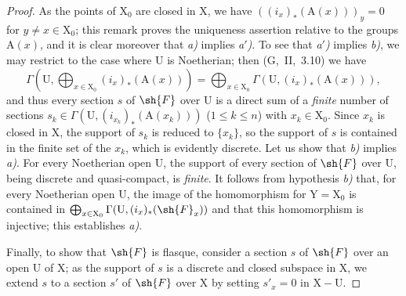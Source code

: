 \begin{proof}
As the points of $\mathrm{X}_0$ are closed in $\mathrm{X}$, we have $((i_x)_*(\mathrm{A}(x)))_y=0$ for $y\neq x\in\mathrm{X}_0$;
this remark proves the uniqueness assertion relative to the groups $\mathrm{A}(x)$, and it is clear moreover that \emph{a)} implies \emph{a$'$)}.
To see that \emph{a$'$)} implies \emph{b)}, we may restrict to the case where $\mathrm{U}$ is Noetherian;
then (G,~II,~3.10) we have
\[
  \Gamma(\mathrm{U},\bigoplus_{x\in\mathrm{X}_0}(i_x)_*(\mathrm{A}(x)))=\bigoplus_{x\in\mathrm{X}_0}\Gamma(\mathrm{U},(i_x)_*(\mathrm{A}(x))),
\]
and thus every section $s$ of $\sh{F}$ over $\mathrm{U}$ is a direct sum of a \emph{finite} number of sections $s_k\in\Gamma(\mathrm{U},(i_{x_k})_*(\mathrm{A}(x_k)))$ ($1\leq k\leq n$) with $x_k\in\mathrm{X}_0$.
Since $x_k$ is closed in $\mathrm{X}$, the support of $s_k$ is reduced to $\{x_k\}$, so the support of $s$ is contained in the finite set of the $x_k$, which is evidently discrete.
Let us show that \emph{b)} implies \emph{a)}.
For every Noetherian open $\mathrm{U}$, the support of every section of $\sh{F}$ over $\mathrm{U}$, being discrete and quasi-compact, is \emph{finite}.
It follows from hypothesis \emph{b)} that, for every Noetherian open $\mathrm{U}$, the image of the homomorphism  for $\mathrm{Y}=\mathrm{X}_0$ is contained in $\bigoplus_{x\in\mathrm{X}_0}\Gamma(\mathrm{U},(i_x)_*(\sh{F}_x))$ and that this homomorphism is injective; this establishes \emph{a)}.

Finally, to show that $\sh{F}$ is flasque, consider a section $s$ of $\sh{F}$ over an open $\mathrm{U}$ of $\mathrm{X}$;
as the support of $s$ is a discrete and closed subspace in $\mathrm{X}$, we extend $s$ to a section $s'$ of $\sh{F}$ over $\mathrm{X}$ by setting $s'_x=0$ in $\mathrm{X}-\mathrm{U}$.
\end{proof}

